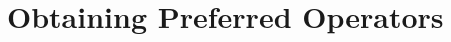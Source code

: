 \documentclass[ppgc,diss,english]{iiufrgs}
\begin{document}
\section{Obtaining Preferred Operators}

\end{document}

